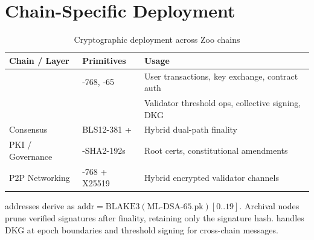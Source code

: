 \section{Chain-Specific Deployment}


\begin{table}[h]
\centering
\small
\begin{tabular}{llp{6cm}}
\toprule
\textbf{Chain / Layer} & \textbf{Primitives} & \textbf{Usage} \\
\midrule
\KChain{} & \MLKEM{}-768, \MLDSA{}-65 & User transactions, key exchange, contract auth \\
\QChain{} & \Ringtail{} & Validator threshold ops, collective signing, DKG \\
Consensus & BLS12-381 + \Ringtail{} & Hybrid dual-path finality \cite{zoo-consensus} \\
PKI / Governance & \SLHDSA{}-SHA2-192s & Root certs, constitutional amendments \\
P2P Networking & \MLKEM{}-768 + X25519 & Hybrid encrypted validator channels \\
\bottomrule
\end{tabular}
\caption{Cryptographic deployment across Zoo chains}
\label{tab:chain-crypto}
\end{table}

\KChain{} addresses derive as $\text{addr} = \text{BLAKE3}(\text{ML-DSA-65.pk})[0..19]$. Archival nodes prune verified \MLDSA{} signatures after finality, retaining only the signature hash. \QChain{} handles \Ringtail{} DKG at epoch boundaries and threshold signing for cross-chain messages.

